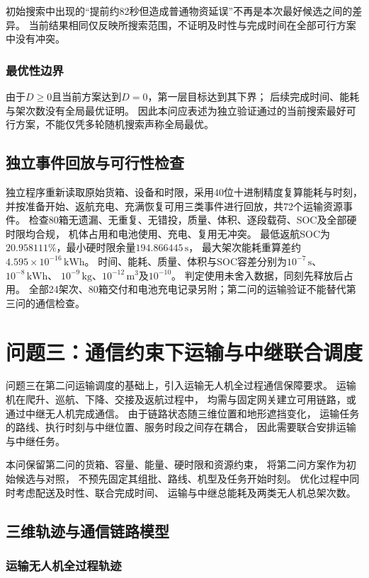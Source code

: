 \documentclass[bwprint]{gmcmthesis}
\begin{document}
初始搜索中出现的“提前约82秒但造成普通物资延误”不再是本次最好候选之间的差异。
当前结果相同仅反映所搜索范围，不证明及时性与完成时间在全部可行方案中没有冲突。

\subsubsection{最优性边界}
由于$D\geq0$且当前方案达到$D=0$，第一层目标达到其下界；
后续完成时间、能耗与架次数没有全局最优证明。
因此本问应表述为独立验证通过的当前搜索最好可行方案，不能仅凭多轮随机搜索声称全局最优。

\subsection{独立事件回放与可行性检查}
独立程序重新读取原始货箱、设备和时限，采用40位十进制精度复算能耗与时刻，
并按准备开始、返航充电、充满恢复可用三类事件进行回放，共72个运输资源事件。
检查80箱无遗漏、无重复、无错投，质量、体积、逐段载荷、SOC及全部硬时限均合规，
机体占用和电池使用、充电、复用无冲突。
最低返航SOC为$20.958111\%$，最小硬时限余量$194.866445\,\mathrm{s}$，
最大架次能耗重算差约$4.595\times10^{-16}\,\mathrm{kWh}$。
时间、能耗、质量、体积与SOC容差分别为$10^{-7}\,\mathrm{s}$、$10^{-8}\,\mathrm{kWh}$、
$10^{-9}\,\mathrm{kg}$、$10^{-12}\,\mathrm{m^3}$及$10^{-10}$。
判定使用未舍入数据，同刻先释放后占用。
全部24架次、80箱交付和电池充电记录另附；第二问的运输验证不能替代第三问的通信检查。


\section{问题三：通信约束下运输与中继联合调度}

问题三在第二问运输调度的基础上，引入运输无人机全过程通信保障要求。
运输机在爬升、巡航、下降、交接及返航过程中，
均需与固定网关建立可用链路，或通过中继无人机完成通信。
由于链路状态随三维位置和地形遮挡变化，
运输任务的路线、执行时刻与中继位置、服务时段之间存在耦合，
因此需要联合安排运输与中继任务。

本问保留第二问的货箱、容量、能量、硬时限和资源约束，
将第二问方案作为初始候选与对照，
不预先固定其组批、路线、机型及任务开始时刻。
优化过程中同时考虑配送及时性、联合完成时间、
运输与中继总能耗及两类无人机总架次数。

\subsection{三维轨迹与通信链路模型}

\subsubsection{运输无人机全过程轨迹}
\end{document}
